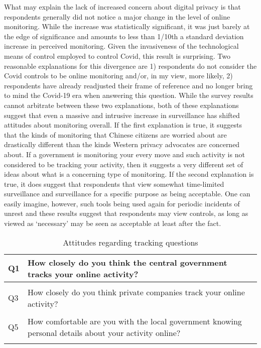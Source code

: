 \documentclass[
  letterpaper,
  DIV=11,
  numbers=noendperiod]{scrartcl}
\begin{document}
What may explain the lack of increased concern about digital privacy is
that respondents generally did not notice a major change in the level of
online monitoring. While the increase was statistically significant, it
was just barely at the edge of significance and amounts to less than
1/10th a standard deviation increase in perceived monitoring. Given the
invasiveness of the technological means of control employed to control
Covid, this result is surprising. Two reasonable explanations for this
divergence are 1) respondents do not consider the Covid controls to be
online monitoring and/or, in my view, more likely, 2) respondents have
already readjusted their frame of reference and no longer bring to mind
the Covid-19 era when answering this question. While the survey results
cannot arbitrate between these two explanations, both of these
explanations suggest that even a massive and intrusive increase in
surveillance has shifted attitudes about monitoring overall. If the
first explanation is true, it suggests that the kinds of monitoring that
Chinese citizens are worried about are drastically different than the
kinds Western privacy advocates are concerned about. If a government is
monitoring your every move and such activity is not considered to be
tracking your activity, then it suggests a very different set of ideas
about what is a concerning type of monitoring. If the second explanation
is true, it does suggest that respondents that view somewhat
time-limited surveillance and surveillance for a specific purpose as
being acceptable. One can easily imagine, however, such tools being used
again for periodic incidents of unrest and these results suggest that
respondents may view controls, as long as viewed as `necessary' may be
seen as acceptable at least after the fact.

\hypertarget{tbl-track.q.text}{}
\begin{table}
\caption{\label{tbl-track.q.text}Attitudes regarding tracking questions }\tabularnewline

\centering
\begin{tabular}[t]{l|>{\raggedright\arraybackslash}p{5in}}
\hline
Q1 & How closely do you think the central government tracks your online activity?\\
\hline
\cellcolor{gray!6}{Q2} & \cellcolor{gray!6}{How closely do you think the local government tracks your online activity?}\\
\hline
Q3 & How closely do you think private companies track your online activity?\\
\hline
\cellcolor{gray!6}{Q4} & \cellcolor{gray!6}{How comfortable are you with the central government knowing personal details about your activity online?}\\
\hline
Q5 & How comfortable are you with the local government knowing personal details about your activity online?\\
\hline
\cellcolor{gray!6}{Q6} & \cellcolor{gray!6}{How comfortable are you with private companies knowing personal details about your activity online?}\\
\hline
\end{tabular}
\end{table}
\end{document}
